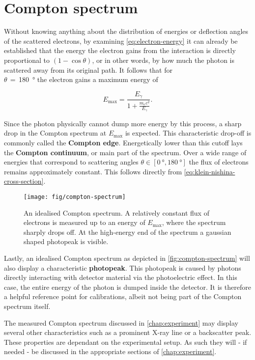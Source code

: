 
\section{Compton spectrum}
\label{sec:compton-spectrum}

Without knowing anything about the distribution of energies or deflection angles of
the scattered electrons, by examining \autoref{eq:electron-energy} it can already be
established that the energy the electron gains from the interaction is directly
proportional to $\left(1-\cos\theta\right)$, or in other words, by how much the
photon is scattered away from its original path. It follows that for \\
$\theta\,=\,$\SI{180}{\degree} the electron gains a maximum energy of

\begin{equation}
\label{eq:maximal-energy}
E_\text{max}=\frac{E_\gamma}{1+\frac{m_e c^2}{E_\gamma}}.
\end{equation}

Since the photon physically cannot dump more energy by this process, a sharp drop in
the Compton spectrum at $E_\text{max}$ is expected. This characteristic drop-off is
commonly called the \textbf{Compton edge}. Energetically lower than this cutoff lays
the \textbf{Compton continuum}, or main part of the spectrum. Over a wide range of
energies that correspond to scattering angles $\theta\in[\SI{0}{\degree},\SI{180}
{\degree}]$ the flux of electrons remains approximately constant. This follows
directly from \autoref{eq:klein-nishina-cross-section}.

\begin{figure}
	\texttt{[image: fig/compton-spectrum]}
	\caption{An idealised Compton spectrum. A relatively constant flux of
	electrons is measured up to an energy of $E_\text{max}$, where the spectrum
	sharply drops off. At the high-energy end of the spectrum a gaussian shaped
	photopeak is visible.}
	\label{fig:compton-spectrum}
\end{figure}

Lastly, an idealised Compton spectrum as depicted in \autoref{fig:compton-spectrum}
will also display a characteristic \textbf{photopeak}. This photopeak is caused by
photons directly interacting with detector material via the photoelectric effect.
In this case, the entire energy of the photon is dumped inside the detector. It is
therefore a helpful reference point for calibrations, albeit not being part of the
Compton spectrum itself.

The measured Compton spectrum discussed in \autoref{chap:experiment} may display
several other characteristics such as a prominent X-ray line or a backscatter peak.
These properties are dependant on the experimental setup. As such they will -
if needed - be discussed in the appropriate sections of \autoref{chap:experiment}.
